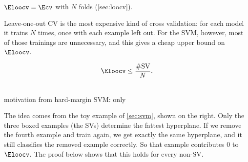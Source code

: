 \begin{recall}
    \(\Eloocv = \Ecv\) with \(N\) folds (\autoref{sec:loocv}).
\end{recall}

Leave-one-out CV is the most expensive kind of cross validation: for each
model it trains \(N\) times, once with each example left out. For the SVM,
however, most of those trainings are unnecessary, and this gives a cheap
upper bound on \(\Eloocv\).

\begin{center}
    \begin{minipage}[c]{0.56\textwidth}
        \begin{theorem}[Claim]\label{thm:loocv-sv}
            \[
                \Eloocv \le \frac{\#\text{SV}}{N}.
            \]
        \end{theorem}
    \end{minipage}%
    \hfill
    \begin{minipage}[c]{0.4\textwidth}
        \centering
        \svmtoysolution\\[2pt]
        {\small motivation from hard-margin SVM: only }
    \end{minipage}
\end{center}

The idea comes from the toy example of \autoref{sec:svm}, shown on the
right. Only the three boxed examples (the SVs) determine the fattest
hyperplane. If we remove the fourth example and train again, we get exactly
the same hyperplane, and it still classifies the removed example correctly.
So that example contributes \(0\) to \(\Eloocv\). The proof below shows that
this holds for every non-SV.

